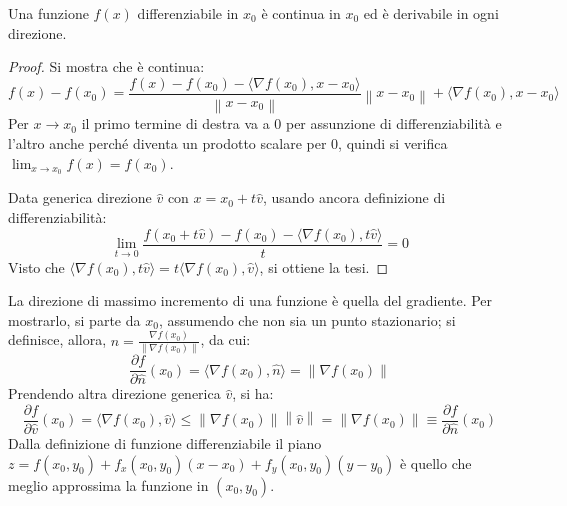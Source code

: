 \documentclass[10pt, a4paper]{scrartcl}
\theoremstyle{definition}
\numberwithin{esempio}{section}
\theoremstyle{definition}
\numberwithin{obs}{section}
\numberwithin{nota}{section}
\numberwithin{equation}{subsection}
\begin{document}
\begin{teorema}
	{}{}
	Una funzione $f(x)$ differenziabile in $x_0$ \`e continua in $x_0$ ed \`e derivabile in ogni direzione.
	\begin{proof}
		Si mostra che \`e continua:
		\[
		f(x) - f(x_0)  = \frac{f(x) - f(x_0) - \langle \nabla f(x_0) , x-x_0 \rangle}{\left\lVert x-x_0 \right\rVert } \left\lVert x-x_0 \right\rVert + \langle \nabla f(x_0) , x-x_0 \rangle
		\] 
		Per $x\to x_0$ il primo termine di destra va a $0$ per assunzione di differenziabilit\`a e l'altro anche perch\'e diventa un prodotto scalare per $0$, quindi si verifica $\lim_{x \to x_0} f(x) = f(x_0)$.

		Data generica direzione $\hat{v}$ con $x = x_0 + t \hat{v}$, usando ancora definizione di differenziabilit\`a:
		\[
		\lim_{t \to 0} \frac{f(x_0 + t \hat{v})- f(x_0) - \langle \nabla f(x_0), t \hat{v} \rangle}{t} = 0 
		\] 
Visto che $\langle \nabla f(x_0 ) , t \hat{v} \rangle = t \langle \nabla f(x_0) ,\hat{v} \rangle$, si ottiene la tesi.
	\end{proof}
\end{teorema}
\noindent La direzione di massimo incremento di una funzione \`e quella del gradiente. Per mostrarlo, si parte da $x_0$, assumendo che non sia un punto stazionario; si definisce, allora, $\hat{n} = \frac{\nabla f(x_0)}{\left\lVert \nabla f(x_0) \right\rVert} $, da cui:
\[
\frac{\partial f}{\partial \hat{n}} (x_0) = \langle \nabla f(x_0), \hat{n} \rangle = \left\lVert \nabla f(x_0) \right\rVert 
\] 
Prendendo altra direzione generica $\hat{v}$, si ha:
\[
\frac{\partial f}{\partial \hat{v}} (x_0) = \langle \nabla f(x_0) , \hat{v}  \rangle \le  \left\lVert \nabla f(x_0) \right\rVert \left\lVert \hat{v} \right\rVert = \left\lVert \nabla f(x_0) \right\rVert \equiv \frac{\partial f}{\partial \hat{n}} (x_0)
\] 
Dalla definizione di funzione differenziabile il piano $z = f(x_0,y_0) +f_x(x_0,y_0) (x-x_0) + f_y(x_0,y_0) (y-y_0)$ \`e quello che meglio approssima la funzione in $(x_0,y_0)$.
\end{document}
